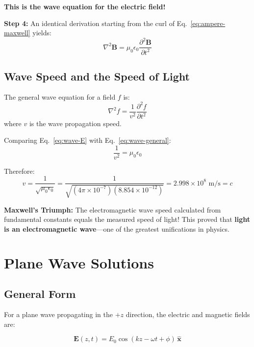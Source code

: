 \textbf{This is the wave equation for the electric field!}

\textbf{Step 4:} An identical derivation starting from the curl of Eq.~\ref{eq:ampere-maxwell} yields:
\begin{equation}
\boxed{\nabla^2 \mathbf{B} = \mu_0 \epsilon_0 \frac{\partial^2 \mathbf{B}}{\partial t^2}}
\label{eq:wave-B}
\end{equation}

\subsection{Wave Speed and the Speed of Light}

The general wave equation for a field $f$ is:
\begin{equation}
\nabla^2 f = \frac{1}{v^2} \frac{\partial^2 f}{\partial t^2}
\label{eq:wave-general}
\end{equation}
where $v$ is the wave propagation speed.

Comparing Eq.~\ref{eq:wave-E} with Eq.~\ref{eq:wave-general}:
\begin{equation}
\frac{1}{v^2} = \mu_0 \epsilon_0
\end{equation}

Therefore:
\begin{equation}
v = \frac{1}{\sqrt{\mu_0 \epsilon_0}} = \frac{1}{\sqrt{(4\pi \times 10^{-7})(8.854 \times 10^{-12})}} = 2.998 \times 10^8 \text{ m/s} = c
\label{eq:speed-of-light}
\end{equation}

\begin{keyconcept}
\textbf{Maxwell's Triumph:} The electromagnetic wave speed calculated from fundamental constants equals the measured speed of light! This proved that \textbf{light is an electromagnetic wave}---one of the greatest unifications in physics.
\end{keyconcept}

\section{Plane Wave Solutions}

\subsection{General Form}

For a plane wave propagating in the $+z$ direction, the electric and magnetic fields are:

\begin{equation}
\mathbf{E}(z,t) = E_0 \cos(kz - \omega t + \phi) \, \hat{\mathbf{x}}
\label{eq:plane-wave-E}
\end{equation}

